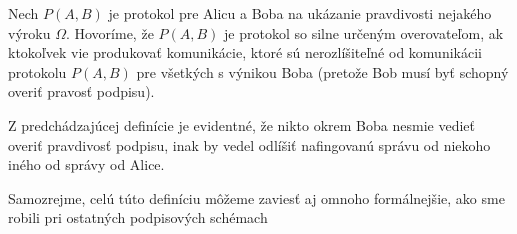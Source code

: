 \begin{definicia}
    Nech $P(A,B)$ je protokol pre Alicu a Boba na ukázanie pravdivosti
    nejakého výroku $\Omega$. Hovoríme, že $P(A,B)$ je protokol so
    silne určeným overovateľom, ak ktokoľvek vie produkovať
    komunikácie, ktoré sú nerozlíšiteľné od komunikácii protokolu
    $P(A,B)$ pre všetkých s výnikou Boba (pretože Bob musí byť schopný
    overiť pravosť podpisu). 
\end{definicia}

\begin{poznamka}
    Z predchádzajúcej definície je evidentné, že nikto okrem Boba nesmie
    vedieť overiť pravdivosť podpisu, inak by vedel odlíšiť nafingovanú správu od
    niekoho iného od správy od Alice.
\end{poznamka}

Samozrejme, celú túto definíciu môžeme zaviesť aj omnoho formálnejšie,
ako sme robili pri ostatných podpisových schémach

